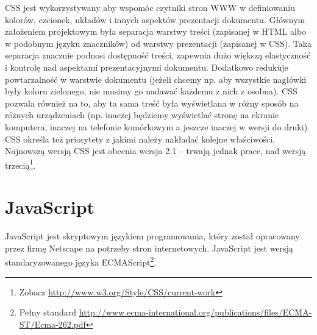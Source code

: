 \documentclass[a4paper,12pt,oneside]{report}
\begin{document}
CSS jest wykorzystywany aby wspomóc czytniki stron WWW w definiowaniu kolorów, czcionek, układów i innych aspektów prezentacji dokumentu. Głównym założeniem projektowym była separacja warstwy treści (zapisanej w HTML albo w podobnym języku znaczników) od warstwy prezentacji (zapisanej w CSS). Taka separacja znacznie podnosi dostępność treści, zapewnia dużo większą elastyczność i kontrolę nad aspektami prezentacyjnymi dokumentu. Dodatkowo redukuje powtarzalność w warstwie dokumentu (jeżeli chcemy np. aby wszystkie nagłówki były koloru zielonego, nie musimy go nadawać każdemu z nich z osobna). CSS pozwala również na to, aby ta sama treść była wyświetlana w różny sposób na różnych urządzeniach (np. inaczej będziemy wyświetlać stronę na ekranie komputera, inaczej na telefonie komórkowym a jeszcze inaczej w wersji do druki). CSS określa też priorytety z jakimi należy nakładać kolejne właściwości. Najnowszą wersją CSS jest obecnia wersja 2.1 -- trwają jednak prace, nad wersją trzecią\footnote{Zobacz \url{http://www.w3.org/Style/CSS/current-work}}.

\section{JavaScript}
\label{sec:javascript}
JavaScript jest skryptowym językiem programowania, który został opracowany przez firmę Netscape na potrzeby stron internetowych. JavaScript jest wersją standaryzowanego języka ECMAScript\footnote{Pełny standard \url{http://www.ecma-international.org/publications/files/ECMA-ST/Ecma-262.pdf}}.
\end{document}
